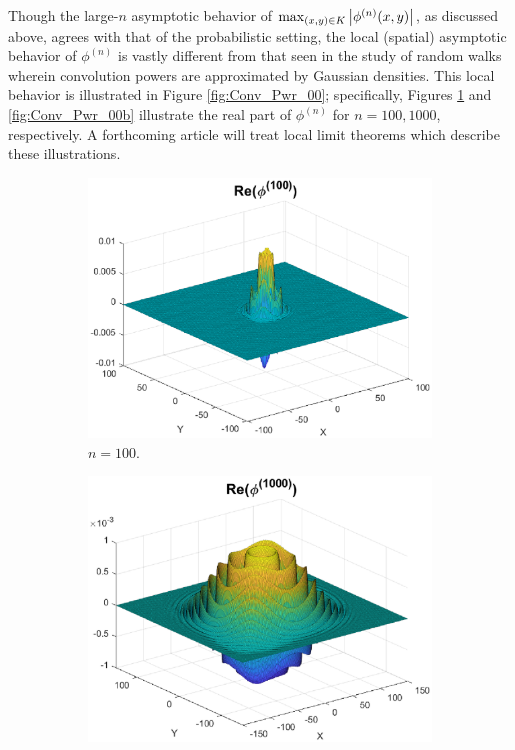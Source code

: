 \documentclass[11pt]{article}
\newenvironment{example}
  {\pushQED{\qed}\renewcommand{\qedsymbol}{$\triangle$}\examplex}
  {\popQED\endexamplex}
\theoremstyle{remark}
\begin{document}
\begin{example}
\noindent Though the large-$n$ asymptotic behavior of $\max_{(x,y)\in K}\abs{\phi^{(n)}(x,y)}$, as discussed above, agrees with that of the probabilistic setting, the local (spatial) asymptotic behavior of $\phi^{(n)}$ is vastly different from that seen in the study of random walks wherein convolution powers are approximated by Gaussian densities. This local behavior is illustrated in Figure \ref{fig:Conv_Pwr_00}; specifically, Figures \ref{fig:Conv_Pwr_00a} and \ref{fig:Conv_Pwr_00b} illustrate the real part of $\phi^{(n)}$ for $n = 100, 1000$, respectively. A forthcoming article will treat local limit theorems which describe these illustrations. 

\begin{figure}[!htb]
    \begin{subfigure}{0.49\textwidth}
    \centering
    \includegraphics[scale=0.58]{Fig6a.eps}
    \caption{$n = 100$.}
    \label{fig:Conv_Pwr_00a}
    \end{subfigure}
    \begin{subfigure}{0.49\textwidth}
    \centering
    \includegraphics[scale=0.58]{Fig6b.eps}

\end{subfigure}
\end{figure}
\end{example}
\end{document}
